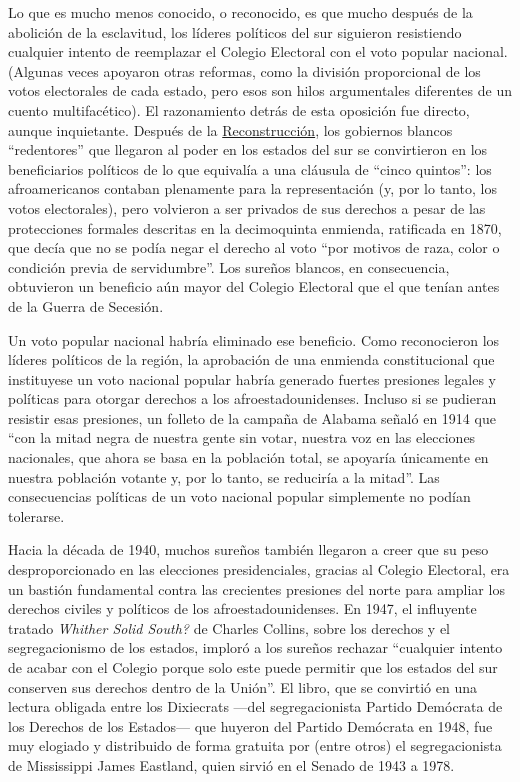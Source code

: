 Lo que es mucho menos conocido, o reconocido, es que mucho después de la
abolición de la esclavitud, los líderes políticos del sur siguieron
resistiendo cualquier intento de reemplazar el Colegio Electoral con el
voto popular nacional. (Algunas veces apoyaron otras reformas, como la
división proporcional de los votos electorales de cada estado, pero esos
son hilos argumentales diferentes de un cuento multifacético). El
razonamiento detrás de esta oposición fue directo, aunque inquietante.
Después de la
\href{https://ar.usembassy.gov/wp-content/uploads/sites/26/2016/10/Capitulo-7_La_guerra_civil_y_la_reconstruccion.pdf}{Reconstrucción},
los gobiernos blancos ``redentores'' que llegaron al poder en los
estados del sur se convirtieron en los beneficiarios políticos de lo que
equivalía a una cláusula de ``cinco quintos'': los afroamericanos
contaban plenamente para la representación (y, por lo tanto, los votos
electorales), pero volvieron a ser privados de sus derechos a pesar de
las protecciones formales descritas en la decimoquinta enmienda,
ratificada en 1870, que decía que no se podía negar el derecho al voto
``por motivos de raza, color o condición previa de servidumbre''. Los
sureños blancos, en consecuencia, obtuvieron un beneficio aún mayor del
Colegio Electoral que el que tenían antes de la Guerra de Secesión.

Un voto popular nacional habría eliminado ese beneficio. Como
reconocieron los líderes políticos de la región, la aprobación de una
enmienda constitucional que instituyese un voto nacional popular habría
generado fuertes presiones legales y políticas para otorgar derechos a
los afroestadounidenses. Incluso si se pudieran resistir esas presiones,
un folleto de la campaña de Alabama señaló en 1914 que ``con la mitad
negra de nuestra gente sin votar, nuestra voz en las elecciones
nacionales, que ahora se basa en la población total, se apoyaría
únicamente en nuestra población votante y, por lo tanto, se reduciría a
la mitad''. Las consecuencias políticas de un voto nacional popular
simplemente no podían tolerarse.

Hacia la década de 1940, muchos sureños también llegaron a creer que su
peso desproporcionado en las elecciones presidenciales, gracias al
Colegio Electoral, era un bastión fundamental contra las crecientes
presiones del norte para ampliar los derechos civiles y políticos de los
afroestadounidenses. En 1947, el influyente tratado \emph{Whither Solid
South?} de Charles Collins, sobre los derechos y el segregacionismo de
los estados, imploró a los sureños rechazar ``cualquier intento de
acabar con el Colegio porque solo este puede permitir que los estados
del sur conserven sus derechos dentro de la Unión''. El libro, que se
convirtió en una lectura obligada entre los Dixiecrats ---del
segregacionista Partido Demócrata de los Derechos de los Estados--- que
huyeron del Partido Demócrata en 1948, fue muy elogiado y distribuido de
forma gratuita por (entre otros) el segregacionista de Mississippi James
Eastland, quien sirvió en el Senado de 1943 a 1978.

